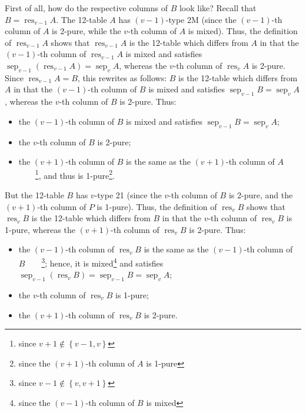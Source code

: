 \documentclass[numbers=enddot,12pt,final,onecolumn,notitlepage]{scrartcl}%
\theoremstyle{definition}
\begin{document}
First of all, how do the respective columns of $B$ look like? Recall that
$B=\operatorname*{res}\nolimits_{v-1}A$. The 12-table $A$ has $\left(
v-1\right)  $-type 2M (since the $\left(  v-1\right)  $-th column of $A$ is
2-pure, while the $v$-th column of $A$ is mixed). Thus, the definition of
$\operatorname*{res}_{v-1}A$ shows that $\operatorname*{res}_{v-1}A$ is the
12-table which differs from $A$ in that the $\left(  v-1\right)  $-th column
of $\operatorname*{res}_{v-1}A$ is mixed and satisfies $\operatorname*{sep}%
\nolimits_{v-1}\left(  \operatorname*{res}\nolimits_{v-1}A\right)
=\operatorname*{sep}\nolimits_{v}A$, whereas the $v$-th column of
$\operatorname*{res}\nolimits_{v}A$ is 2-pure. Since $\operatorname*{res}%
\nolimits_{v-1}A=B$, this rewrites as follows: $B$ is the 12-table which
differs from $A$ in that the $\left(  v-1\right)  $-th column of $B$ is mixed
and satisfies $\operatorname*{sep}\nolimits_{v-1}B=\operatorname*{sep}%
\nolimits_{v}A$, whereas the $v$-th column of $B$ is 2-pure. Thus:

\begin{itemize}
\item the $\left(  v-1\right)  $-th column of $B$ is mixed and satisfies
$\operatorname*{sep}\nolimits_{v-1}B=\operatorname*{sep}\nolimits_{v}A$;

\item the $v$-th column of $B$ is 2-pure;

\item the $\left(  v+1\right)  $-th column of $B$ is the same as the $\left(
v+1\right)  $-th column of $A$\ \ \ \ \footnote{since $v+1\notin\left\{
v-1,v\right\}  $}, and thus is 1-pure\footnote{since the $\left(  v+1\right)
$-th column of $A$ is 1-pure}.
\end{itemize}

But the 12-table $B$ has $v$-type 21 (since the $v$-th column of $B$ is
2-pure, and the $\left(  v+1\right)  $-th column of $P$ is 1-pure). Thus, the
definition of $\operatorname*{res}\nolimits_{v}B$ shows that
$\operatorname*{res}\nolimits_{v}B$ is the 12-table which differs from $B$ in
that the $v$-th column of $\operatorname*{res}\nolimits_{v}B$ is 1-pure,
whereas the $\left(  v+1\right)  $-th column of $\operatorname*{res}%
\nolimits_{v}B$ is 2-pure. Thus:

\begin{itemize}
\item the $\left(  v-1\right)  $-th column of $\operatorname*{res}%
\nolimits_{v}B$ is the same as the $\left(  v-1\right)  $-th column of
$B$\ \ \ \ \footnote{since $v-1\notin\left\{  v,v+1\right\}  $}; hence, it is
mixed\footnote{since the $\left(  v-1\right)  $-th column of $B$ is mixed} and
satisfies $\operatorname*{sep}\nolimits_{v-1}\left(  \operatorname*{res}%
\nolimits_{v}B\right)  =\operatorname*{sep}\nolimits_{v-1}%
B=\operatorname*{sep}\nolimits_{v}A$;

\item the $v$-th column of $\operatorname*{res}\nolimits_{v}B$ is 1-pure;

\item the $\left(  v+1\right)  $-th column of $\operatorname*{res}%
\nolimits_{v}B$ is 2-pure.
\end{itemize}
\end{document}
